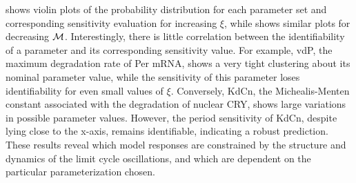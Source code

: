 {\begin{figure}[p]
  \label{fig:3_2}
\end{figure}

 shows violin plots of the probability distribution for each parameter set and corresponding sensitivity evaluation for increasing $\xi$, while  shows similar plots for decreasing $\cal M$. 
Interestingly, there is little correlation between the identifiability of a parameter and its corresponding sensitivity value. 
For example, vdP, the maximum degradation rate of Per mRNA, shows a very tight clustering about its nominal parameter value, while the sensitivity of this parameter loses identifiability for even small values of $\xi$. 
Conversely, KdCn, the Michealis-Menten constant associated with the degradation of nuclear CRY, shows large variations in possible parameter values. 
However, the period sensitivity of KdCn, despite lying close to the x-axis, remains identifiable, indicating a robust prediction. 
These results reveal which model responses are constrained by the structure and dynamics of the limit cycle oscillations, and which are dependent on the particular parameterization chosen.

}
